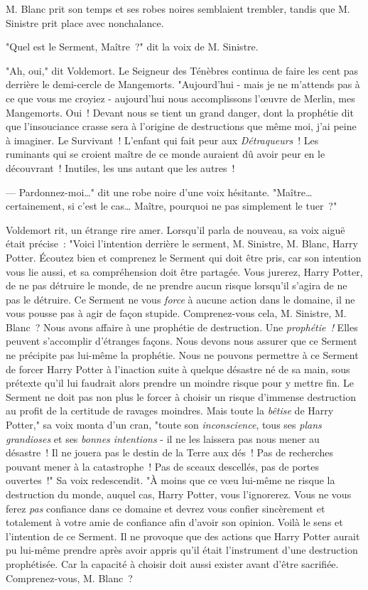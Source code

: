 M. Blanc prit son temps et ses robes noires semblaient trembler, tandis que M. Sinistre prit place avec nonchalance.

"Quel est le Serment, Maître~?" dit la voix de M. Sinistre.

"Ah, oui," dit Voldemort. Le Seigneur des Ténèbres continua de faire les cent pas derrière le demi-cercle de Mangemorts. "Aujourd'hui - mais je ne m'attends pas à ce que vous me croyiez - aujourd'hui nous accomplissons l'œuvre de Merlin, mes Mangemorts. Oui~! Devant nous se tient un grand danger, dont la prophétie dit que l'insouciance crasse sera à l'origine de destructions que même moi, j'ai peine à imaginer. Le Survivant~! L'enfant qui fait peur aux \emph{Détraqueurs}~! Les ruminants qui se croient maître de ce monde auraient dû avoir peur en le découvrant~! Inutiles, les uns autant que les autres~!

--- Pardonnez-moi…" dit une robe noire d'une voix hésitante. "Maître… certainement, si c'est le cas… Maître, pourquoi ne pas simplement le tuer~?"

Voldemort rit, un étrange rire amer. Lorsqu'il parla de nouveau, sa voix aiguë était précise~: "Voici l'intention derrière le serment, M. Sinistre, M. Blanc, Harry Potter. Écoutez bien et comprenez le Serment qui doit être pris, car son intention vous lie aussi, et sa compréhension doit être partagée. Vous jurerez, Harry Potter, de ne pas détruire le monde, de ne prendre aucun risque lorsqu'il s'agira de ne pas le détruire. Ce Serment ne vous \emph{force} à aucune action dans le domaine, il ne vous pousse pas à agir de façon stupide. Comprenez-vous cela, M. Sinistre, M. Blanc~? Nous avons affaire à une prophétie de destruction. Une \emph{prophétie~!} Elles peuvent s'accomplir d'étranges façons. Nous devons nous assurer que ce Serment ne précipite pas lui-même la prophétie. Nous ne pouvons permettre à ce Serment de forcer Harry Potter à l'inaction suite à quelque désastre né de sa main, sous prétexte qu'il lui faudrait alors prendre un moindre risque pour y mettre fin. Le Serment ne doit pas non plus le forcer à choisir un risque d'immense destruction au profit de la certitude de ravages moindres. Mais toute la \emph{bêtise} de Harry Potter," sa voix monta d'un cran, "toute son \emph{inconscience}, tous ses \emph{plans grandioses} et ses \emph{bonnes intentions} - il ne les laissera pas nous mener au désastre~! Il ne jouera pas le destin de la Terre aux dés~! Pas de recherches pouvant mener à la catastrophe~! Pas de sceaux descellés, pas de portes ouvertes~!" Sa voix redescendit. "À moins que ce vœu lui-même ne risque la destruction du monde, auquel cas, Harry Potter, vous l'ignorerez. Vous ne vous ferez \emph{pas} confiance dans ce domaine et devrez vous confier sincèrement et totalement à votre amie de confiance afin d'avoir son opinion. Voilà le sens et l'intention de ce Serment. Il ne provoque que des actions que Harry Potter aurait pu lui-même prendre après avoir appris qu'il était l'instrument d'une destruction prophétisée. Car la capacité à choisir doit aussi exister avant d'être sacrifiée. Comprenez-vous, M. Blanc~?

